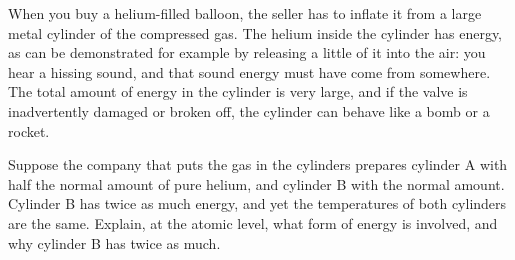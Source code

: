 When you buy a helium-filled balloon, the seller has to inflate it
        from a large metal cylinder of the compressed gas. The helium inside
        the cylinder has energy, as can be demonstrated for example by releasing
        a little of it into the air: you hear a hissing sound, and that sound
        energy must have come from somewhere. The total amount of energy in the
        cylinder is very large, and if the valve is inadvertently damaged or broken off,
        the cylinder can behave like a bomb or a rocket.
        
        Suppose the company that puts the gas in the cylinders prepares cylinder A with
        half the normal amount of pure helium, and cylinder B with the normal amount.
        Cylinder B has twice as much energy, and yet the temperatures of both cylinders
        are the same. Explain, at the atomic level, what form of energy is involved,
        and why cylinder B has twice as much.
